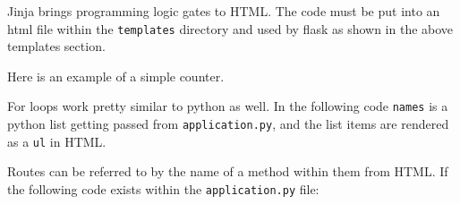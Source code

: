 \documentclass[]{book}
\newenvironment{Shaded}{\begin{snugshade}}{\end{snugshade}}
\newcommand{\ExtensionTok}[1]{#1}
\newcommand{\KeywordTok}[1]{\textcolor[rgb]{0.13,0.29,0.53}{\textbf{#1}}}
\newcommand{\NormalTok}[1]{#1}
\newcommand{\OperatorTok}[1]{\textcolor[rgb]{0.81,0.36,0.00}{\textbf{#1}}}
\begin{document}
Jinja brings programming logic gates to HTML. The code must be put into an html file within the \texttt{templates} directory and used by flask as shown in the above templates section.

\begin{Shaded}
\end{Shaded}

Here is an example of a simple counter.

\begin{Shaded}
\end{Shaded}

For loops work pretty similar to python as well. In the following code \texttt{names} is a python list getting passed from \texttt{application.py}, and the list items are rendered as a \texttt{ul} in HTML.

\begin{Shaded}
\end{Shaded}

Routes can be referred to by the name of a method within them from HTML. If the following code exists within the \texttt{application.py} file:
\end{document}
